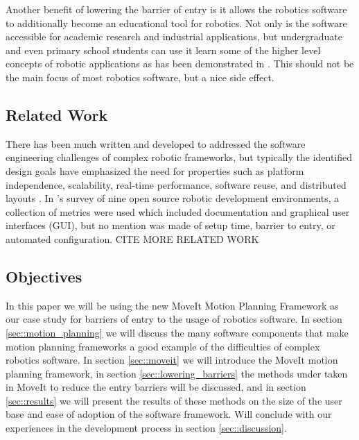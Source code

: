 \documentclass[10pt,journal,compsoc]{joser1}
\begin{document}
{Another benefit of lowering the barrier of entry is it allows the robotics software to additionally become an educational tool for robotics. Not only is the software accessible for academic research and industrial applications, but undergraduate and even primary school students can use it learn some of the higher level concepts of robotic applications as has been demonstrated in \cite{correll2013one, moll2011teaching, }. This should not be the main focus of most robotics software, but a nice side effect.

\subsection{Related Work}

There has been much written and developed to addressed the software engineering challenges of complex robotic frameworks, but typically the identified design goals have emphasized the need for properties such as platform independence, scalability, real-time performance, software reuse, and distributed layouts \cite{realtime_framework, collett2005player, kramer2007development}. In \cite{kramer2007development}'s survey of nine open source robotic development environments, a collection of metrics were used which included documentation and graphical user interfaces (GUI), but no mention was made of setup time, barrier to entry, or automated configuration. CITE MORE RELATED WORK

\subsection{Objectives}

In this paper we will be using the new MoveIt Motion Planning Framework as our case study for barriers of entry to the usage of robotics software. In section \ref{sec::motion_planning} we will discuss the many software components that make motion planning frameworks a good example of the difficulties of complex robotics software. In section \ref{sec::moveit} we will introduce the MoveIt motion planning framework, in section \ref{sec::lowering_barriers} the methods under taken in MoveIt to reduce the entry barriers will be discussed, and in section \ref{sec::results} we will present the results of these methods on the size of the user base and ease of adoption of the software framework. Will conclude with our experiences in the development process in section \ref{sec::discussion}.

}
\end{document}

